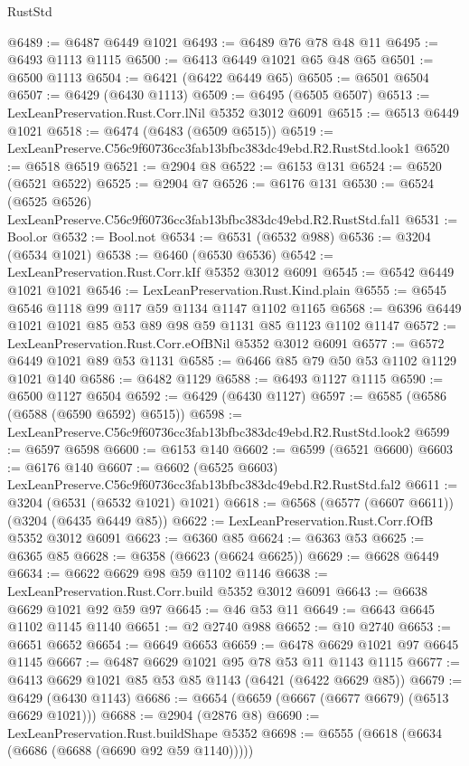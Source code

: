 \begin{lexlean}{RustStd}
\begin{coremodule}
@6489 := @6487 @6449 @1021
@6493 := @6489 @76 @78 @48 @11
@6495 := @6493 @1113 @1115
@6500 := @6413 @6449 @1021 @65 @48 @65
@6501 := @6500 @1113
@6504 := @6421 (@6422 @6449 @65)
@6505 := @6501 @6504
@6507 := @6429 (@6430 @1113)
@6509 := @6495 (@6505 @6507)
@6513 := LexLeanPreservation.Rust.Corr.lNil @5352 @3012 @6091
@6515 := @6513 @6449 @1021
@6518 := @6474 (@6483 (@6509 @6515))
@6519 := LexLeanPreserve.C56c9f60736cc3fab13bfbc383dc49ebd.R2.RustStd.look1
@6520 := @6518 @6519
@6521 := @2904 @8
@6522 := @6153 @131
@6524 := @6520 (@6521 @6522)
@6525 := @2904 @7
@6526 := @6176 @131
@6530 := @6524 (@6525 @6526) LexLeanPreserve.C56c9f60736cc3fab13bfbc383dc49ebd.R2.RustStd.fal1
@6531 := Bool.or
@6532 := Bool.not
@6534 := @6531 (@6532 @988)
@6536 := @3204 (@6534 @1021)
@6538 := @6460 (@6530 @6536)
@6542 := LexLeanPreservation.Rust.Corr.kIf @5352 @3012 @6091
@6545 := @6542 @6449 @1021 @1021
@6546 := LexLeanPreservation.Rust.Kind.plain
@6555 := @6545 @6546 @1118 @99 @117 @59 @1134 @1147 @1102 @1165
@6568 := @6396 @6449 @1021 @1021 @85 @53 @89 @98 @59 @1131 @85 @1123 @1102 @1147
@6572 := LexLeanPreservation.Rust.Corr.eOfBNil @5352 @3012 @6091
@6577 := @6572 @6449 @1021 @89 @53 @1131
@6585 := @6466 @85 @79 @50 @53 @1102 @1129 @1021 @140
@6586 := @6482 @1129
@6588 := @6493 @1127 @1115
@6590 := @6500 @1127 @6504
@6592 := @6429 (@6430 @1127)
@6597 := @6585 (@6586 (@6588 (@6590 @6592) @6515))
@6598 := LexLeanPreserve.C56c9f60736cc3fab13bfbc383dc49ebd.R2.RustStd.look2
@6599 := @6597 @6598
@6600 := @6153 @140
@6602 := @6599 (@6521 @6600)
@6603 := @6176 @140
@6607 := @6602 (@6525 @6603) LexLeanPreserve.C56c9f60736cc3fab13bfbc383dc49ebd.R2.RustStd.fal2
@6611 := @3204 (@6531 (@6532 @1021) @1021)
@6618 := @6568 (@6577 (@6607 @6611)) (@3204 (@6435 @6449 @85))
@6622 := LexLeanPreservation.Rust.Corr.fOfB @5352 @3012 @6091
@6623 := @6360 @85
@6624 := @6363 @53
@6625 := @6365 @85
@6628 := @6358 (@6623 (@6624 @6625))
@6629 := @6628 @6449
@6634 := @6622 @6629 @98 @59 @1102 @1146
@6638 := LexLeanPreservation.Rust.Corr.build @5352 @3012 @6091
@6643 := @6638 @6629 @1021 @92 @59 @97
@6645 := @46 @53 @11
@6649 := @6643 @6645 @1102 @1145 @1140
@6651 := @2 @2740 @988
@6652 := @10 @2740
@6653 := @6651 @6652
@6654 := @6649 @6653
@6659 := @6478 @6629 @1021 @97 @6645 @1145
@6667 := @6487 @6629 @1021 @95 @78 @53 @11 @1143 @1115
@6677 := @6413 @6629 @1021 @85 @53 @85 @1143 (@6421 (@6422 @6629 @85))
@6679 := @6429 (@6430 @1143)
@6686 := @6654 (@6659 (@6667 (@6677 @6679) (@6513 @6629 @1021)))
@6688 := @2904 (@2876 @8)
@6690 := LexLeanPreservation.Rust.buildShape @5352
@6698 := @6555 (@6618 (@6634 (@6686 (@6688 (@6690 @92 @59 @1140)))))

\end{coremodule}
\end{lexlean}
